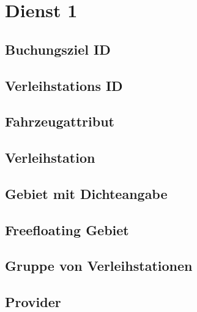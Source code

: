 \section{Dienst 1}
\label{sec:Datenmodell:Dienst1}

\subsection*{Buchungsziel ID}



\subsection*{Verleihstations ID}



\subsection*{Fahrzeugattribut}



\subsection*{Verleihstation}



\subsection*{Gebiet mit Dichteangabe}



\subsection*{Freefloating Gebiet}



\subsection*{Gruppe von Verleihstationen}



\subsection*{Provider}



